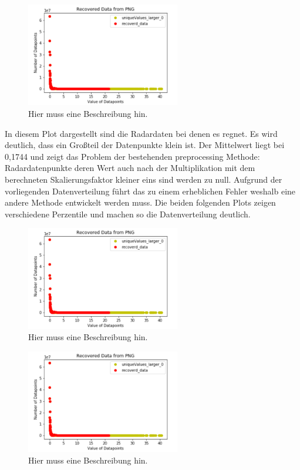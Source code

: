 \begin{figure}[H]
 \centering
 \includegraphics[width=0.6\textwidth,angle=0]{abb/datenaufbereitung_beispiel}
 \caption[Datenaufbereitung]{Hier muss eine Beschreibung hin.}
\label{fig:datenaufbereitung}
\end{figure}

In diesem Plot dargestellt sind die Radardaten bei denen es regnet. Es wird deutlich, dass ein Großteil der Datenpunkte klein ist. Der Mittelwert liegt bei 0,1744 und zeigt das Problem der bestehenden preprocessing Methode: Radardatenpunkte deren Wert auch nach der Multiplikation mit dem berechneten Skalierungsfaktor kleiner eins sind werden zu null. Aufgrund der vorliegenden Datenverteilung führt das zu einem erheblichen Fehler weshalb eine andere Methode entwickelt werden muss.   
Die beiden folgenden Plots zeigen verschiedene Perzentile und machen so die Datenverteilung deutlich.  

\begin{figure}[H]
 \centering
 \includegraphics[width=0.6\textwidth,angle=0]{abb/datenaufbereitung_beispiel}
 \caption[Datenaufbereitung]{Hier muss eine Beschreibung hin.}
\label{fig:datenaufbereitung}
\end{figure}

\begin{figure}[H]
 \centering
 \includegraphics[width=0.6\textwidth,angle=0]{abb/datenaufbereitung_beispiel}
 \caption[Datenaufbereitung]{Hier muss eine Beschreibung hin.}
\label{fig:datenaufbereitung}
\end{figure}

